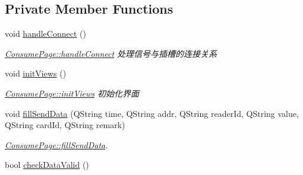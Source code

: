 \subsection*{Private Member Functions}
\begin{DoxyCompactItemize}
\item 
void \mbox{\hyperlink{class_consume_page_add3af5a3661b2a7172bddb5fa81452a0}{handle\+Connect}} ()
\begin{DoxyCompactList}\small\item\em \mbox{\hyperlink{class_consume_page_add3af5a3661b2a7172bddb5fa81452a0}{Consume\+Page\+::handle\+Connect}} 处理信号与插槽的连接关系 \end{DoxyCompactList}\item 
void \mbox{\hyperlink{class_consume_page_a53f5ce5e4192a56330fac399aa43c199}{init\+Views}} ()
\begin{DoxyCompactList}\small\item\em \mbox{\hyperlink{class_consume_page_a53f5ce5e4192a56330fac399aa43c199}{Consume\+Page\+::init\+Views}} 初始化界面 \end{DoxyCompactList}\item 
void \mbox{\hyperlink{class_consume_page_a4b2cabc78b852bea679c71e0a8a1e459}{fill\+Send\+Data}} (Q\+String time, Q\+String addr, Q\+String reader\+Id, Q\+String value, Q\+String card\+Id, Q\+String remark)
\begin{DoxyCompactList}\small\item\em \mbox{\hyperlink{class_consume_page_a4b2cabc78b852bea679c71e0a8a1e459}{Consume\+Page\+::fill\+Send\+Data}}. \end{DoxyCompactList}\item 
bool \mbox{\hyperlink{class_consume_page_a35a81e758924ebde005e01f78eda143f}{check\+Data\+Valid}} ()
\end{DoxyCompactItemize}
